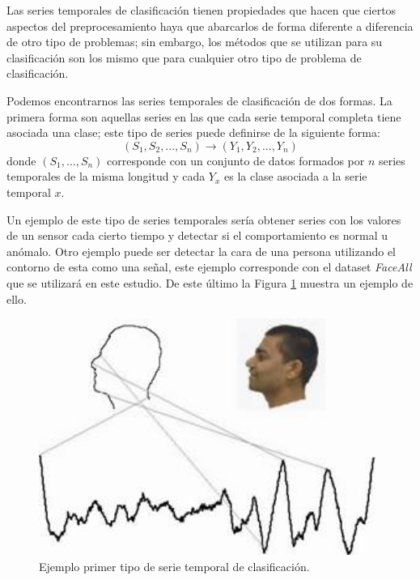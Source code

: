 Las series temporales de clasificación tienen propiedades que hacen que ciertos aspectos del preprocesamiento haya que abarcarlos de forma diferente a diferencia de otro tipo de problemas; sin embargo, los métodos que se utilizan para su clasificación son los mismo que para cualquier otro tipo de problema de clasificación.\newline

Podemos encontrarnos las series temporales de clasificación de dos formas. La primera forma son aquellas series en las que cada serie temporal completa tiene asociada una clase; este tipo de series puede definirse de la siguiente forma:\newline
$$ (S_1, S_2 ,..., S_n) \rightarrow (Y_1, Y_2, ..., Y_n) $$
\noindent donde $(S_1, ..., S_n)$ corresponde con un conjunto de datos formados por $n$ series temporales de la misma longitud y cada $Y_x$ es la clase asociada a la serie temporal $x$.\newline

Un ejemplo de este tipo de series temporales sería obtener series con los valores de un sensor cada cierto tiempo y detectar si el comportamiento es normal u anómalo. Otro ejemplo puede ser detectar la cara de una persona utilizando el contorno de esta como una señal, este ejemplo corresponde con el dataset \textit{FaceAll} que se utilizará en este estudio. De este último la Figura \ref{fig:face_all_fig} muestra un ejemplo de ello.\newline

\begin{figure}[H]
	\centering
	\includegraphics[width=110mm]{imagenes/facell_all_example.jpg}
	\caption{Ejemplo primer tipo de serie temporal de clasificación.}
	\label{fig:face_all_fig}
\end{figure}
\verticalspace

